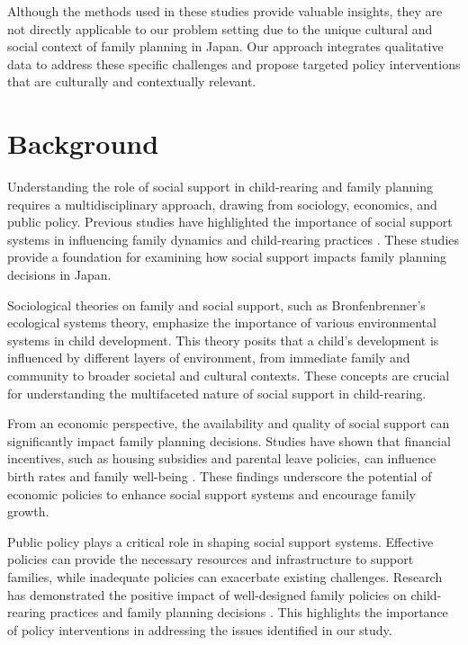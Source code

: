 \documentclass{article} %
\begin{document}
Although the methods used in these studies provide valuable insights, they are not directly applicable to our problem setting due to the unique cultural and social context of family planning in Japan. Our approach integrates qualitative data to address these specific challenges and propose targeted policy interventions that are culturally and contextually relevant.

\section{Background}
\label{sec:background}

Understanding the role of social support in child-rearing and family planning requires a multidisciplinary approach, drawing from sociology, economics, and public policy. Previous studies have highlighted the importance of social support systems in influencing family dynamics and child-rearing practices \citep{park2023generative, shanahan2023role}. These studies provide a foundation for examining how social support impacts family planning decisions in Japan.

Sociological theories on family and social support, such as Bronfenbrenner's ecological systems theory, emphasize the importance of various environmental systems in child development. This theory posits that a child's development is influenced by different layers of environment, from immediate family and community to broader societal and cultural contexts. These concepts are crucial for understanding the multifaceted nature of social support in child-rearing.

From an economic perspective, the availability and quality of social support can significantly impact family planning decisions. Studies have shown that financial incentives, such as housing subsidies and parental leave policies, can influence birth rates and family well-being \citep{poledna2023economic, zhou2023peer}. These findings underscore the potential of economic policies to enhance social support systems and encourage family growth.

Public policy plays a critical role in shaping social support systems. Effective policies can provide the necessary resources and infrastructure to support families, while inadequate policies can exacerbate existing challenges. Research has demonstrated the positive impact of well-designed family policies on child-rearing practices and family planning decisions \citep{liu2023agentbench, west2023agent}. This highlights the importance of policy interventions in addressing the issues identified in our study.
\end{document}
